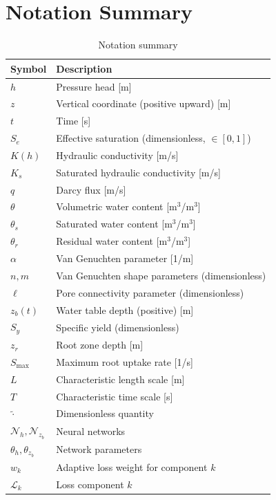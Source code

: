 \documentclass[11pt,a4paper]{article}
\begin{document}
\appendix
\section{Notation Summary}

\begin{table}[h]
\centering
\begin{tabular}{@{}ll@{}}
\toprule
\textbf{Symbol} & \textbf{Description} \\
\midrule
$h$ & Pressure head [m] \\
$z$ & Vertical coordinate (positive upward) [m] \\
$t$ & Time [s] \\
$S_e$ & Effective saturation (dimensionless, $\in [0,1]$) \\
$K(h)$ & Hydraulic conductivity [m/s] \\
$K_s$ & Saturated hydraulic conductivity [m/s] \\
$q$ & Darcy flux [m/s] \\
$\theta$ & Volumetric water content [m$^3$/m$^3$] \\
$\theta_s$ & Saturated water content [m$^3$/m$^3$] \\
$\theta_r$ & Residual water content [m$^3$/m$^3$] \\
$\alpha$ & Van Genuchten parameter [1/m] \\
$n, m$ & Van Genuchten shape parameters (dimensionless) \\
$\ell$ & Pore connectivity parameter (dimensionless) \\
$z_b(t)$ & Water table depth (positive) [m] \\
$S_y$ & Specific yield (dimensionless) \\
$z_r$ & Root zone depth [m] \\
$S_{\max}$ & Maximum root uptake rate [1/s] \\
$L$ & Characteristic length scale [m] \\
$T$ & Characteristic time scale [s] \\
$\tilde{\cdot}$ & Dimensionless quantity \\
$\mathcal{N}_h, \mathcal{N}_{z_b}$ & Neural networks \\
$\theta_h, \theta_{z_b}$ & Network parameters \\
$w_k$ & Adaptive loss weight for component $k$ \\
$\mathcal{L}_k$ & Loss component $k$ \\
\bottomrule
\end{tabular}
\caption{Notation summary}
\end{table}
\end{document}
